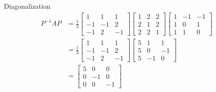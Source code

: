 \documentclass{beamer}
\begin{document}
        \begin{frame}{Diagonalization}
                \begin{align*}
                        P^{-1}AP &= \frac{1}{3} \begin{bmatrix}
                                1 & 1 & 1 \\ -1 & -1 & 2 \\ -1 & 2 & -1
                        \end{bmatrix}
                        \begin{bmatrix}
                                1 & 2 & 2 \\ 2 & 1 & 2 \\ 2 & 2 & 1
                        \end{bmatrix}
                        \begin{bmatrix}
                                1 & -1 & -1 \\ 1 & 0 & 1 \\ 1 & 1 & 0
                        \end{bmatrix} \\
                        &= \frac{1}{3} \begin{bmatrix}
                                1 & 1 & 1 \\ -1 & -1 & 2 \\ -1 & 2 & -1
                        \end{bmatrix}
                        \begin{bmatrix}
                                5 & 1 & 1 \\ 5 & 0 & -1 \\ 5 & -1 & 0
                        \end{bmatrix} \\
                        &= \begin{bmatrix}
                                5 & 0 & 0 \\ 0 & -1 & 0 \\ 0 & 0 & -1
                        \end{bmatrix}
                \end{align*}
        \end{frame}
\end{document}
